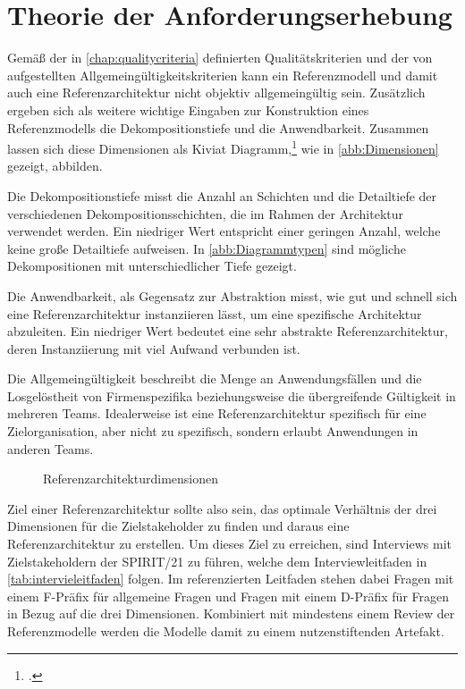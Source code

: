 \section{Theorie der Anforderungserhebung}\label{chap:requirements}

Gemäß der in \autoref{chap:qualitycriteria} definierten Qualitätskriterien und der von \citeauthor{vomBrocke.2003} aufgestellten Allgemeingültigkeitskriterien kann ein Referenzmodell und damit auch eine Referenzarchitektur nicht objektiv allgemeingültig sein. Zusätzlich ergeben sich als weitere wichtige Eingaben zur Konstruktion eines Referenzmodells die Dekompositionstiefe und die Anwendbarkeit. Zusammen lassen sich diese Dimensionen als Kiviat Diagramm,\footcite[Vgl.][33\psqq]{Kolence.1973} wie in \autoref{abb:Dimensionen} gezeigt, abbilden. 

Die Dekompositionstiefe misst die Anzahl an Schichten und die Detailtiefe der verschiedenen Dekompositionsschichten, die im Rahmen der Architektur verwendet werden. Ein niedriger Wert entspricht einer geringen Anzahl, welche keine große Detailtiefe aufweisen. In \autoref{abb:Diagrammtypen} sind mögliche Dekompositionen mit unterschiedlicher Tiefe gezeigt. 

Die Anwendbarkeit, als Gegensatz zur Abstraktion misst, wie gut und schnell sich eine Referenzarchitektur instanziieren lässt, um eine spezifische Architektur abzuleiten. Ein niedriger Wert bedeutet eine sehr abstrakte Referenzarchitektur, deren Instanziierung mit viel Aufwand verbunden ist. 

Die Allgemeingültigkeit beschreibt die Menge an Anwendungsfällen und die Losgelöstheit von Firmenspezifika beziehungsweise die übergreifende Gültigkeit in mehreren Teams. Idealerweise ist eine Referenzarchitektur spezifisch für eine Zielorganisation, aber nicht zu spezifisch, sondern erlaubt Anwendungen in anderen Teams.

\begin{figure}[H]
\centering
{}

\caption{Referenzarchitekturdimensionen}
\label{abb:Dimensionen}
\end{figure}

Ziel einer Referenzarchitektur sollte also sein, das optimale Verhältnis der drei Dimensionen für die Zielstakeholder zu finden und daraus eine Referenzarchitektur zu erstellen. Um dieses Ziel zu erreichen, sind Interviews mit Zielstakeholdern der SPIRIT/21 zu führen, welche dem Interviewleitfaden in \autoref{tab:intervieleitfaden} folgen. Im referenzierten Leitfaden stehen dabei Fragen mit einem F-Präfix für allgemeine Fragen und Fragen mit einem D-Präfix für Fragen in Bezug auf die drei Dimensionen. Kombiniert mit mindestens einem Review der Referenzmodelle werden die Modelle damit zu einem nutzenstiftenden Artefakt.



